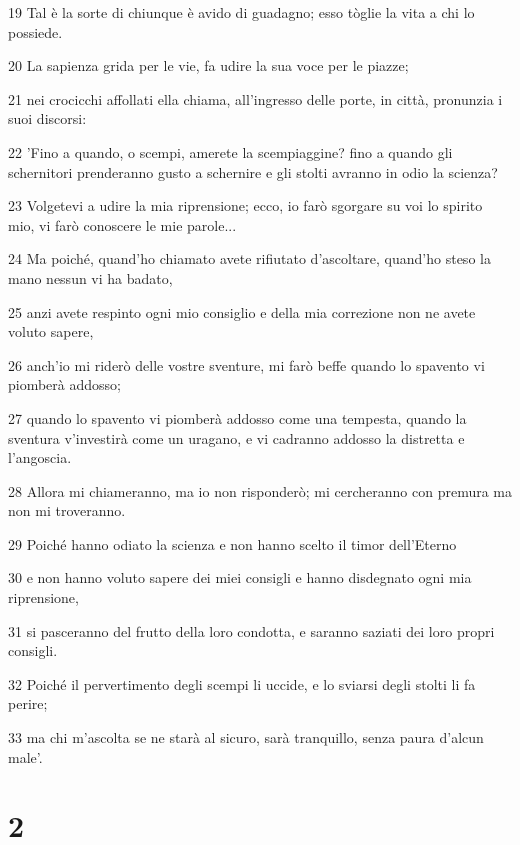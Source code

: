 \par 19 Tal è la sorte di chiunque è avido di guadagno; esso tòglie la vita a chi lo possiede.
\par 20 La sapienza grida per le vie, fa udire la sua voce per le piazze;
\par 21 nei crocicchi affollati ella chiama, all'ingresso delle porte, in città, pronunzia i suoi discorsi:
\par 22 'Fino a quando, o scempi, amerete la scempiaggine? fino a quando gli schernitori prenderanno gusto a schernire e gli stolti avranno in odio la scienza?
\par 23 Volgetevi a udire la mia riprensione; ecco, io farò sgorgare su voi lo spirito mio, vi farò conoscere le mie parole...
\par 24 Ma poiché, quand'ho chiamato avete rifiutato d'ascoltare, quand'ho steso la mano nessun vi ha badato,
\par 25 anzi avete respinto ogni mio consiglio e della mia correzione non ne avete voluto sapere,
\par 26 anch'io mi riderò delle vostre sventure, mi farò beffe quando lo spavento vi piomberà addosso;
\par 27 quando lo spavento vi piomberà addosso come una tempesta, quando la sventura v'investirà come un uragano, e vi cadranno addosso la distretta e l'angoscia.
\par 28 Allora mi chiameranno, ma io non risponderò; mi cercheranno con premura ma non mi troveranno.
\par 29 Poiché hanno odiato la scienza e non hanno scelto il timor dell'Eterno
\par 30 e non hanno voluto sapere dei miei consigli e hanno disdegnato ogni mia riprensione,
\par 31 si pasceranno del frutto della loro condotta, e saranno saziati dei loro propri consigli.
\par 32 Poiché il pervertimento degli scempi li uccide, e lo sviarsi degli stolti li fa perire;
\par 33 ma chi m'ascolta se ne starà al sicuro, sarà tranquillo, senza paura d'alcun male'.

\chapter{2}

